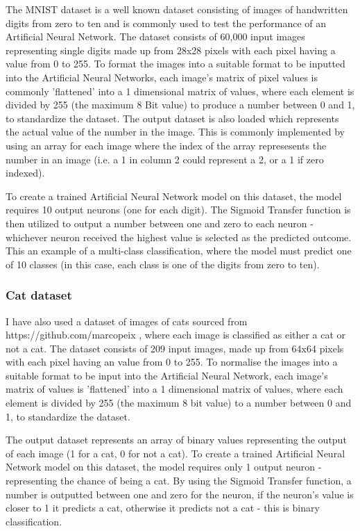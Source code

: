 \documentclass[./project-report/src/latex/project-report.tex]{subfiles}
\begin{document}
The MNIST dataset \cite{wiki_mnist} is a well known dataset consisting of images of handwritten digits from zero to ten and is commonly used to test the performance of an 
Artificial Neural 
Network. The dataset consists of 60,000 input images representing single digits made up from 28x28 pixels with each pixel having a value from 0 to 255. To format the
images into a suitable format to be inputted into the Artificial Neural Networks, each image's matrix of pixel values is commonly 'flattened' into a 1 dimensional matrix of 
values, where each element is divided by 255 (the maximum 8 Bit value) to produce a number between 0 and 1, to standardize the dataset. The output dataset is also loaded which 
represents the actual value of the number in the image. This is commonly implemented by using an array for each image where the index of the array represesents the number in 
an image (i.e. a 1 in column 2 could represent a 2, or a 1 if zero indexed).

To create a trained Artificial Neural Network model on this dataset, the model requires 10 output neurons (one for each digit). The Sigmoid Transfer function is then utilized 
to output a number between one and zero to each neuron - whichever neuron received the highest value is selected as the predicted outcome. This an example of a multi-class 
classification, where the model must predict one of 10 classes (in this case, each class is one of the digits from zero to ten).

\subsubsection{Cat dataset}

I have also used a dataset of images of cats sourced from \newline https://github.com/marcopeix \cite{catdatabase}, where each image is classified as either a cat or not a 
cat. The dataset consists of 209 input images, made up from 64x64 pixels with each pixel having an value from 0 to 255. To normalise the images into a suitable format to be 
input into the Artificial Neural Network, each image's matrix of values is 'flattened' into a 1 dimensional matrix of values, where each element is divided by 255 (the 
maximum 8 bit value) to a number between 0 and 1, to standardize the dataset.

The output dataset represents an array of binary values representing the output of each image (1 for a cat, 0 for not a cat). To create a trained Artificial Neural Network 
model on this dataset, the model requires only 1 output neuron - representing the chance of being a cat. By using the Sigmoid Transfer function, a number is outputted between 
one and zero for the neuron, if the neuron's value is closer to 1 it predicts a cat, otherwise it predicts not a cat - this is binary classification.
\end{document}
